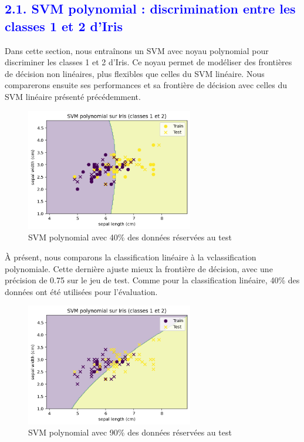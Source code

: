 \documentclass[
  12pt,
]{article}
\begin{document}
\subsection{\texorpdfstring{\textcolor{blue}{2.1. SVM polynomial : discrimination entre les classes 1 et 2 d’Iris}}{}}\label{section-3}

Dans cette section, nous entraînons un SVM avec noyau polynomial pour
discriminer les classes 1 et 2 d'Iris. Ce noyau permet de modéliser des
frontières de décision non linéaires, plus flexibles que celles du SVM
linéaire. Nous comparerons ensuite ses performances et sa frontière de
décision avec celles du SVM linéaire présenté précédemment.

\begin{figure}[H]
    \centering
    \includegraphics[width=0.65\textwidth]{vis/classif_poly_40test_60train.png}
    \caption{SVM polynomial avec 40\% des données réservées au test}
    \label{fig:svm_poly_iris_40test_60train}
\end{figure}

À présent, nous comparons la classification linéaire à la
vclassification polynomiale. Cette dernière ajuste mieux la frontière de
décision, avec une précision de 0.75 sur le jeu de test. Comme pour la
classification linéaire, 40\% des données ont été utilisées pour
l'évaluation.

\begin{figure}[H]
    \centering
    \includegraphics[width=0.65\textwidth]{vis/classif_poly_90test_10train.png}
    \caption{SVM polynomial avec 90\% des données réservées au test}
    \label{fig:svm_poly_iris_90test_10train}
\end{figure}
\end{document}
